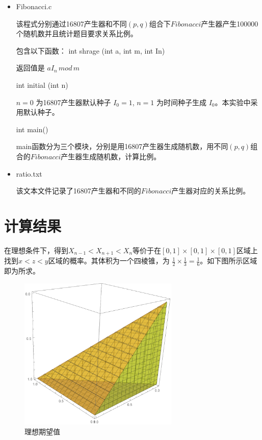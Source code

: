 \documentclass[UTF8]{ctexart}
\begin{document}
	\begin{itemize}
		\item Fibonacci.c 
		
		该程式分别通过16807产生器和不同$(p,q)$组合下$Fibonacci$产生器产生100000个随机数并且统计题目要求关系比例。
		
		包含以下函数：
		\subitem int shrage (int a, int m, int In)
		
		返回值是 $aI_n\,mod\,m$
		
		\subitem int initial (int n)
		
		$n=0$ 为16807产生器默认种子 $I_0=1$, $n=1$ 为时间种子生成 $I_0$。本实验中采用默认种子。
		
		\subitem int main()
		
		main函数分为三个模块，分别是用16807产生器生成随机数，用不同$(p,q)$组合的$Fibonacci$产生器生成随机数，计算比例。
		
		\item ratio.txt
		
		该文本文件记录了16807产生器和不同的$Fibonacci$产生器对应的关系比例。	
	\end{itemize}
	
	\section{计算结果}
\begin{flushleft}
		在理想条件下，得到$X_{n-1}<X_{n+1}<X_n$等价于在$[0,1]\times[0,1]\times[0,1]$区域上找到$x<z<y$区域的概率。其体积为一个四棱锥，为 $\frac{1}{2}\times\frac{1}{3}=\frac{1}{6}$。如下图所示区域即为所求。
\end{flushleft}
	
	\begin{figure}[H]
	\centering\includegraphics[width=3in]{ideal.pdf}
	\caption{理想期望值}\label{fig:1}
	\end{figure}
\end{document}
